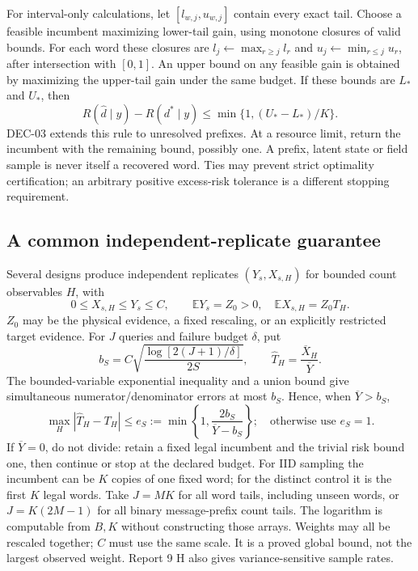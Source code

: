 \documentclass[10pt,a4paper]{article}
\newcommand{\E}{\mathbb E}
\begin{document}
For interval-only calculations, let $[l_{w,j},u_{w,j}]$ contain every exact tail.
Choose a feasible incumbent maximizing lower-tail gain, using monotone closures of valid bounds.
For each word these closures are $l_j\leftarrow\max_{r\geq j}l_r$ and
$u_j\leftarrow\min_{r\leq j}u_r$, after intersection with $[0,1]$.
An upper bound on any feasible gain is obtained by maximizing the upper-tail gain under the same budget.
If these bounds are $L_*$ and $U_*$, then
\[
 R(\widehat d\mid y)-R(d^*\mid y)\leq\min\{1,(U_*-L_*)/K\}.
\]
DEC-03 extends this rule to unresolved prefixes. At a resource limit, return the incumbent with the
remaining bound, possibly one. A prefix, latent state or field sample is never itself a recovered word.
Ties may prevent strict optimality certification; an arbitrary positive excess-risk tolerance is a
different stopping requirement.

\subsection{A common independent-replicate guarantee}
\label{sec:replicates}
Several designs produce independent replicates $(Y_s,X_{s,H})$ for bounded count observables $H$, with
\[
 0\leq X_{s,H}\leq Y_s\leq C,\qquad
 \E Y_s=Z_0>0,\quad \E X_{s,H}=Z_0T_H.
\]
$Z_0$ may be the physical evidence, a fixed rescaling, or an explicitly restricted target evidence.
For $J$ queries and failure budget $\delta$, put
\[
 b_S=C\sqrt{\frac{\log[2(J+1)/\delta]}{2S}},\qquad
 \widehat T_H=\frac{\overline X_H}{\overline Y}.
\]
The bounded-variable exponential inequality and a union bound give simultaneous numerator/denominator
errors at most $b_S$. Hence, when $\overline Y>b_S$,
\begin{equation}
 \max_H|\widehat T_H-T_H|
 \leq e_S:=\min\left\{1,\frac{2b_S}{\overline Y-b_S}\right\};
 \quad\text{otherwise use }e_S=1.
 \label{eq:replicate-bound}
\end{equation}
If $\overline Y=0$, do not divide: retain a fixed legal incumbent and the trivial risk bound one,
then continue or stop at the declared budget. For IID sampling the incumbent can be $K$ copies of
one fixed word; for the distinct control it is the first $K$ legal words.
Take $J=MK$ for all word tails, including unseen words, or $J=K(2M-1)$ for all binary message-prefix
count tails. The logarithm is computable from $B,K$ without constructing those arrays.
Weights may all be rescaled together; $C$ must use the same scale. It is a proved global bound, not
the largest observed weight. Report 9 H also gives variance-sensitive sample rates.
\end{document}
